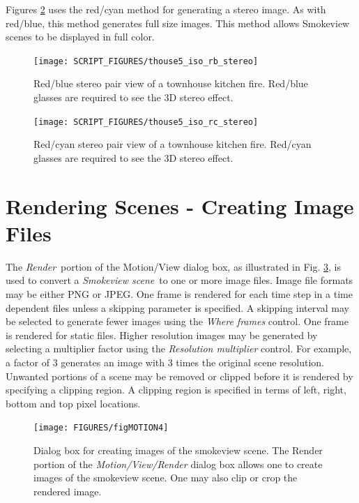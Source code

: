 \documentclass[11pt,twoside]{book}
\begin{document}
Figures \ref{figrcstereo} uses the red/cyan method for generating
a stereo image.  As with red/blue, this method generates full size
images.  This method allows Smokeview
scenes to be displayed in full color.

\begin{figure}[\figoptions]
\begin{center}
\texttt{[image: SCRIPT\_FIGURES/thouse5\_iso\_rb\_stereo]}\\
\caption[Red/blue stereo pair view of a townhouse kitchen fire.]{
Red/blue stereo pair view of a townhouse kitchen fire. Red/blue
glasses are required to see the 3D stereo effect. }
\label{figrbstereo}
\end{center}
\end{figure}

\begin{figure}[\figoptions]
\begin{center}
\texttt{[image: SCRIPT\_FIGURES/thouse5\_iso\_rc\_stereo]}\\
\caption[Red/cyan stereo pair view of a townhouse kitchen fire.]{
Red/cyan stereo pair view of a townhouse kitchen fire. Red/cyan
glasses are required to see the 3D stereo effect. }
\label{figrcstereo}
\end{center}
\end{figure}

\section{Rendering Scenes - Creating Image Files}
The {\em Render}\ portion of the Motion/View dialog box,
as illustrated in Fig. \ref{figMOTIONrender}, is used to convert a {\em Smokeview scene}\ to one or more image files.  Image file formats may be either PNG or JPEG. One frame is rendered for each time step in a time dependent files unless a skipping parameter is specified.
A skipping interval may be selected to generate fewer images using the {\em Where frames} control.  One frame is rendered for static files.  Higher resolution images may be generated by selecting a multiplier factor using the {\em Resolution multiplier} control. For example, a factor of 3 generates an image with 3 times the original scene resolution.  Unwanted portions of a scene may be removed or clipped before it is rendered by specifying a clipping region. A clipping region is specified in terms of left, right, bottom and top pixel locations.

\begin{figure}[\figoptions]
\begin{center}
\texttt{[image: FIGURES/figMOTION4]}
\caption[Dialog box for creating images of the smokeview scene.]
{Dialog box for creating images of the smokeview scene. The Render portion of the {\em Motion/View/Render} dialog box allows one to create images of the smokeview scene. One may also clip or crop the rendered image.}
\label{figMOTIONrender}
\end{center}
\end{figure}
\end{document}

